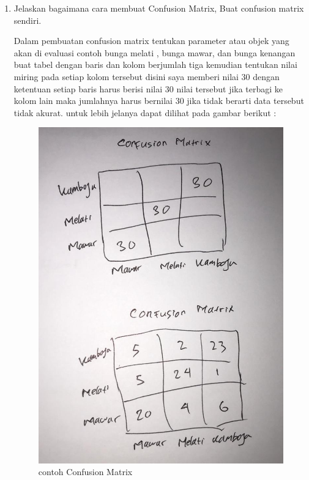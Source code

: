 \begin{enumerate}
\item Jelaskan bagaimana cara membuat Confusion Matrix, Buat confusion matrix sendiri.\par
Dalam pembuatan confusion matrix tentukan parameter atau objek yang akan di evaluasi contoh bunga melati , bunga mawar, dan bunga kenangan buat tabel dengan baris dan kolom berjumlah tiga kemudian tentukan nilai miring pada setiap kolom tersebut disini saya memberi nilai 30 dengan ketentuan setiap baris harus berisi nilai 30 nilai tersebut jika terbagi ke kolom lain maka jumlahnya harus bernilai 30 jika tidak berarti data tersebut tidak akurat. untuk lebih jelanya dapat dilihat pada gambar berikut :
\begin{figure}[ht]
\centering
\includegraphics[scale=0.2]{figures/1174042/chapter2/1,6.jpeg}
\caption{contoh Confusion Matrix}
\label{contoh}
\end{figure}



\end{enumerate}

